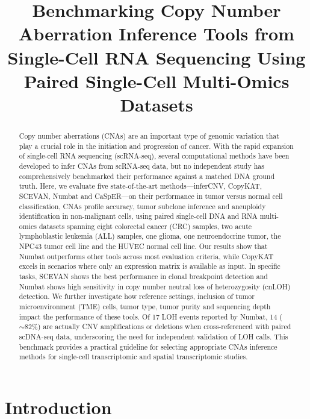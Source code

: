 \documentclass[11pt]{article}
\title{Benchmarking Copy Number Aberration Inference Tools from Single-Cell RNA Sequencing Using Paired Single-Cell Multi-Omics Datasets}
\author{}
\date{}
\begin{document}
\maketitle

\begin{abstract}
Copy number aberrations (CNAs) are an important type of genomic variation that play a crucial role in the initiation and progression of cancer. With the rapid expansion of single-cell RNA sequencing (scRNA-seq), several computational methods have been developed to infer CNAs from scRNA-seq data, but no independent study has comprehensively benchmarked their performance against a matched DNA ground truth. Here, we evaluate five state-of-the-art methods---inferCNV, CopyKAT, SCEVAN, Numbat and CaSpER---on their performance in tumor versus normal cell classification, CNAs profile accuracy, tumor subclone inference and aneuploidy identification in non-malignant cells, using paired single-cell DNA and RNA multi-omics datasets spanning eight colorectal cancer (CRC) samples, two acute lymphoblastic leukemia (ALL) samples, one glioma, one neuroendocrine tumor, the NPC43 tumor cell line and the HUVEC normal cell line. Our results show that Numbat outperforms other tools across most evaluation criteria, while CopyKAT excels in scenarios where only an expression matrix is available as input. In specific tasks, SCEVAN shows the best performance in clonal breakpoint detection and Numbat shows high sensitivity in copy number neutral loss of heterozygosity (cnLOH) detection. We further investigate how reference settings, inclusion of tumor microenvironment (TME) cells, tumor type, tumor purity and sequencing depth impact the performance of these tools. Of 17 LOH events reported by Numbat, 14 (${\sim}82\%$) are actually CNV amplifications or deletions when cross-referenced with paired scDNA-seq data, underscoring the need for independent validation of LOH calls. This benchmark provides a practical guideline for selecting appropriate CNAs inference methods for single-cell transcriptomic and spatial transcriptomic studies.
\end{abstract}

\section{Introduction}
\end{document}
